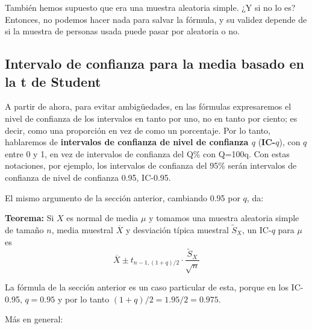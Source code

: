 \documentclass[
  spanish,
  letterpaper,
  DIV=11,
  numbers=noendperiod]{scrreprt}
\begin{document}
También hemos supuesto que era una muestra aleatoria simple. ¿Y si no lo
es? Entonces, no podemos hacer nada para salvar la fórmula, y su validez
depende de si la muestra de personas usada puede pasar por aleatoria o
no.

\subsection{Intervalo de confianza para la media basado en la t de
Student}\label{intervalo-de-confianza-para-la-media-basado-en-la-t-de-student}

\begin{tcolorbox}[enhanced jigsaw, arc=.35mm, bottomrule=.15mm, bottomtitle=1mm, breakable, colback=white, colbacktitle=quarto-callout-warning-color!10!white, colframe=quarto-callout-warning-color-frame, coltitle=black, left=2mm, leftrule=.75mm, opacityback=0, opacitybacktitle=0.6, rightrule=.15mm, title=\textcolor{quarto-callout-warning-color}{\faExclamationTriangle}\hspace{0.5em}{Advertencia}, titlerule=0mm, toprule=.15mm, toptitle=1mm]

A partir de ahora, para evitar ambigüedades, en las fórmulas
expresaremos el nivel de confianza de los intervalos en tanto por uno,
no en tanto por ciento; es decir, como una proporción en vez de como un
porcentaje. Por lo tanto, hablaremos de \textbf{intervalos de confianza
de nivel de confianza \(q\)} (\textbf{IC-\(q\)}), con \(q\) entre 0 y 1,
en vez de intervalos de confianza del Q\% con Q=100q. Con estas
notaciones, por ejemplo, los intervalos de confianza del 95\% serán
intervalos de confianza de nivel de confianza 0.95, IC-0.95.

\end{tcolorbox}

El mismo argumento de la sección anterior, cambiando 0.95 por \(q\), da:

\textbf{Teorema:} Si \(X\) es normal de media \(\mu\) y tomamos una
muestra aleatoria simple de tamaño \(n\), media muestral
\(\overline{X}\) y desviación típica muestral \(\widetilde{S}_X\), un
IC-\(q\) para \(\mu\) es \[
\overline{X}\pm t_{n-1,(1+q)/2}\cdot \frac{\widetilde{S}_X}{\sqrt{n}}
\]

La fórmula de la sección anterior es un caso particular de esta, porque
en los IC-0.95, \(q=0.95\) y por lo tanto \((1+q)/2=1.95/2=0.975\).

Más en general:
\end{document}
